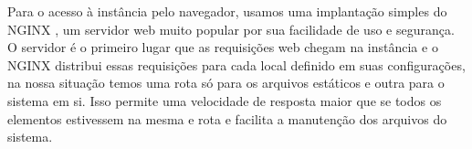 \par Para o acesso à instância pelo navegador, usamos uma implantação simples do NGINX \cite{NGINX}, um servidor web muito popular por sua facilidade de uso e segurança. O servidor é o primeiro lugar que as requisições web chegam na instância e o NGINX distribui essas requisições para cada local definido em suas configurações, na nossa situação temos uma rota só para os arquivos estáticos e outra para o sistema em si. Isso permite uma velocidade de resposta maior que se todos os elementos estivessem na mesma e rota e facilita a manutenção dos arquivos do sistema.





